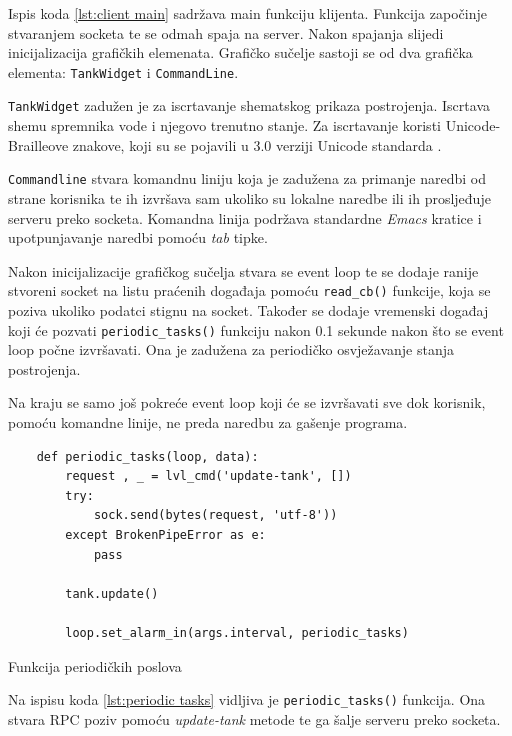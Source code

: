 Ispis koda \ref{lst:client main} sadržava main funkciju klijenta. Funkcija
započinje stvaranjem socketa te se odmah spaja na server. Nakon spajanja
slijedi inicijalizacija grafičkih elemenata. Grafičko sučelje sastoji se od dva
grafička elementa: \texttt{TankWidget} i \texttt{CommandLine}.

\texttt{TankWidget} zadužen je za iscrtavanje shematskog prikaza
postrojenja. Iscrtava shemu spremnika vode i njegovo trenutno stanje. Za
iscrtavanje koristi Unicode-Brailleove znakove, koji su se pojavili u 3.0 verziji
Unicode standarda \cite{unicode}.

\texttt{Commandline} stvara komandnu liniju koja je zadužena za
primanje naredbi od strane korisnika te ih izvršava sam ukoliko su lokalne
naredbe ili ih prosljeđuje serveru preko socketa. Komandna linija podržava
standardne \emph{Emacs} kratice i upotpunjavanje naredbi pomoću \emph{tab}
tipke.

Nakon inicijalizacije grafičkog sučelja stvara se event loop te se dodaje ranije
stvoreni socket na listu praćenih događaja pomoću \texttt{read_cb()}
funkcije, koja se poziva ukoliko podatci stignu na socket. Također se dodaje
vremenski događaj koji će pozvati \texttt{periodic_tasks()} funkciju
nakon 0.1 sekunde nakon što se event loop počne izvršavati. Ona je zadužena za
periodičko osvježavanje stanja postrojenja.

Na kraju se samo još pokreće event loop koji će se izvršavati sve dok korisnik,
pomoću komandne linije, ne preda naredbu za gašenje programa.

\begin{listing}[H]
\centering
\begin{verbatim}
    def periodic_tasks(loop, data):
        request , _ = lvl_cmd('update-tank', [])
        try:
            sock.send(bytes(request, 'utf-8'))
        except BrokenPipeError as e:
            pass

        tank.update()

        loop.set_alarm_in(args.interval, periodic_tasks)
\end{verbatim}
\caption{Funkcija periodičkih poslova}
\label{lst:periodic tasks}
\end{listing}

Na ispisu koda \ref{lst:periodic tasks} vidljiva je
\texttt{periodic_tasks()} funkcija. Ona stvara RPC poziv pomoću
\emph{update-tank} metode te ga šalje serveru preko socketa.

